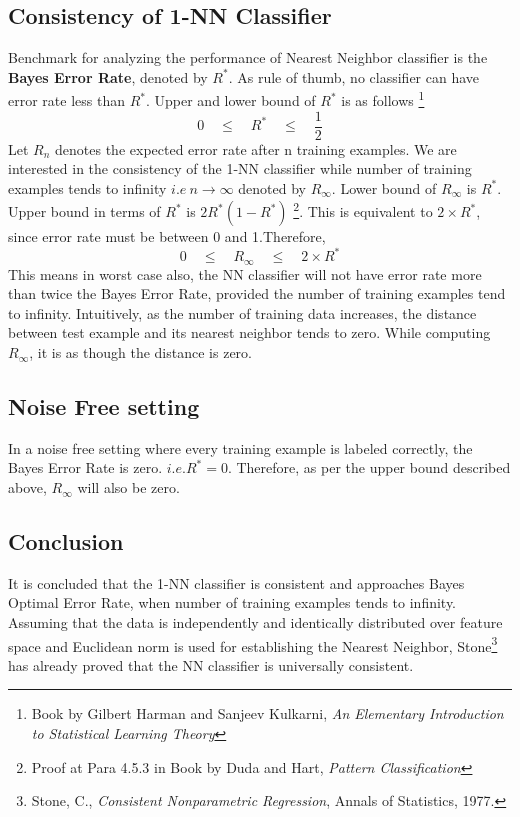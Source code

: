 \documentclass[a4paper,11pt]{article}
\newcommand\tab[1][1cm]{\hspace*{#1}}
\begin{document}
\begin{mlsolution} 
\section*{Consistency of 1-NN Classifier}
\tab Benchmark for analyzing the performance of Nearest Neighbor classifier is the \textbf{Bayes Error Rate}, denoted by $R^*$. As rule of thumb, no classifier can have error rate less than $R^*$. Upper and lower bound of $R^*$ is as follows \footnote{Book by Gilbert Harman and Sanjeev Kulkarni, \textit{An Elementary Introduction to Statistical Learning Theory}} \\
$$ 0 \quad \leq \quad R^* \quad \leq \quad \frac{1}{2} $$
\noindent
\tab Let $R_n$ denotes the expected error rate after n training examples. We are interested in the consistency of the 1-NN classifier while number of training examples tends to infinity $i.e\ n \rightarrow \infty$ denoted by $R_\infty $. Lower bound of $R_\infty $ is $R^*$. Upper bound in terms of $R^*$ is $2R^* \left( 1 - R^* \right)$ \footnote{Proof at Para 4.5.3 in Book by Duda and Hart, \textit{Pattern Classification}}. This is equivalent to $2 \times R^*$, since error rate must be between 0 and 1.Therefore, 
$$ 0 \quad \leq \quad R_\infty \quad \leq \quad 2 \times R^* $$
\noindent
\tab This means in worst case also, the NN classifier will not have error rate more than twice the Bayes Error Rate, provided the number of training examples tend to infinity. Intuitively, as the number of training data increases, the distance between test example and its nearest neighbor tends to zero. While computing $R_\infty$, it is as though the distance is zero. 
\subsection*{Noise Free setting}
\tab In a noise free setting where every training example is labeled correctly, the Bayes Error Rate is zero. $i.e. R^* = 0 $. Therefore, as per the upper bound described above, $R_\infty$ will also be zero. 
\subsection*{Conclusion}
\noindent
\tab It is concluded that the 1-NN classifier is consistent and approaches Bayes Optimal Error Rate, when number of training examples tends to infinity. Assuming that the data is independently and identically distributed over feature space and Euclidean norm is used for establishing the Nearest Neighbor, Stone\footnote{Stone, C.,
\textit{Consistent Nonparametric Regression}, Annals of Statistics, 1977.} has already proved that the NN classifier is universally consistent.

\end{mlsolution}
\end{document}
